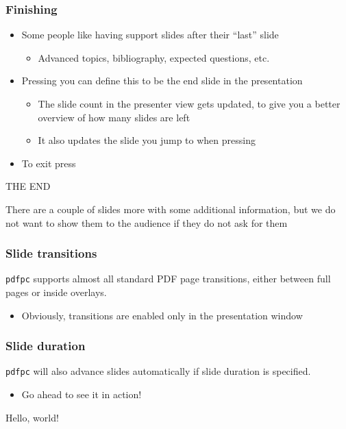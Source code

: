 \documentclass{beamer}
\newcommand{\singleitem}[1]{\begin{itemize}\item #1\end{itemize}}
\newcommand{\pdfpc}{\texttt{pdfpc}\xspace}
\begin{document}
\begin{frame}
  \frametitle{Finishing}
  \begin{itemize}
    \item Some people like having support slides after their ``last'' slide
      \singleitem{Advanced topics, bibliography, expected questions, etc.}
    \item Pressing  you can define this to be the end slide
      in the presentation
      \singleitem{The slide count in the presenter view gets updated, to give
        you a better overview of how many slides are left}
      \singleitem{It also updates the slide you jump to when pressing
        \keys{End}}
    \item To exit press 
  \end{itemize}
  \vfill
  \begin{center}
    THE END
  \end{center}
  \vfill
  {\footnotesize There are a couple of slides more with some additional
    information, but we do not want to show them to the audience if they do not
    ask for them}
\end{frame}

\begin{frame}
  \frametitle{Slide transitions}

  \pdfpc supports almost all standard PDF page transitions, either between full
  pages or inside overlays.

  \singleitem{Obviously, transitions are enabled only in the presentation
    window}


\end{frame}

\begin{frame}
  \frametitle{Slide duration}

  \pdfpc will also advance slides automatically if slide duration is specified.
  \singleitem{Go ahead to see it in action!}
  \vskip 1cm

  {\Huge\hfill
  Hello,
  world!
  \hfill}
\end{frame}
\end{document}
